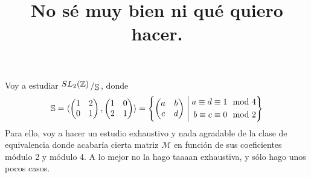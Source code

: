 \documentclass{article}
\title{No sé muy bien ni qué quiero hacer.}
\date{}
\newcommand\tab[1][0.6cm]{\hspace*{#1}}
\newcommand\nl{\newline\tab}
\newcommand{\bigslant}[2]{{\raisebox{.2em}{$#1$}\left/\raisebox{-.2em}{$#2$}\right.}}
\newcommand{\suchthat}{\;\ifnum\currentgrouptype=16 \middle\fi|\;}
\begin{document}
	\maketitle
	Voy a estudiar $ \bigslant{SL_2(\mathbb{Z})}{\mathbb{S}}$, donde  
	$$\mathbb{S} = 
	\langle
	\begin{pmatrix}
	1 & 2 \\
	0 & 1 
	\end{pmatrix},
	\begin{pmatrix}
	1 & 0 \\
	2 & 1 
	\end{pmatrix}
	\rangle = \left\{ 
	\begin{pmatrix}
	a & b \\
	c & d 
	\end{pmatrix}
	\suchthat
	\begin{split}
	a \equiv d \equiv 1 &\mod 4 \\
	b \equiv c \equiv 0 &\mod 2 
	\end{split}
	\right\}
	$$
	\nl
	Para ello, voy a hacer un estudio exhaustivo y nada agradable de la clase de equivalencia donde acabaría cierta matriz $	\mathcal{M}$ en función de sus coeficientes módulo 2 y módulo 4.\nl
	A lo mejor no la hago taaaan exhaustiva, y sólo hago unos pocos casos.
	\nl 
	
\end{document}
